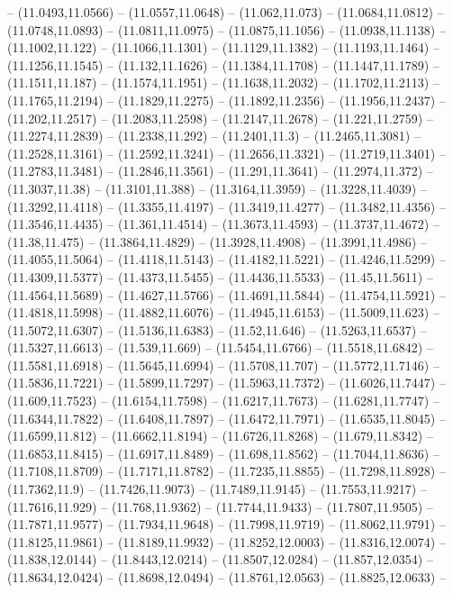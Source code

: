 {-- (11.0493,11.0566) -- (11.0557,11.0648) -- (11.062,11.073) -- (11.0684,11.0812) -- (11.0748,11.0893) -- (11.0811,11.0975) -- (11.0875,11.1056) -- (11.0938,11.1138) -- (11.1002,11.122) -- (11.1066,11.1301) -- (11.1129,11.1382) -- (11.1193,11.1464)
-- (11.1256,11.1545) -- (11.132,11.1626) -- (11.1384,11.1708) -- (11.1447,11.1789) -- (11.1511,11.187) -- (11.1574,11.1951) -- (11.1638,11.2032) -- (11.1702,11.2113) -- (11.1765,11.2194) -- (11.1829,11.2275) -- (11.1892,11.2356) -- (11.1956,11.2437)
-- (11.202,11.2517) -- (11.2083,11.2598) -- (11.2147,11.2678) -- (11.221,11.2759) -- (11.2274,11.2839) -- (11.2338,11.292) -- (11.2401,11.3) -- (11.2465,11.3081) -- (11.2528,11.3161) -- (11.2592,11.3241) -- (11.2656,11.3321) -- (11.2719,11.3401) --
(11.2783,11.3481) -- (11.2846,11.3561) -- (11.291,11.3641) -- (11.2974,11.372) -- (11.3037,11.38) -- (11.3101,11.388) -- (11.3164,11.3959) -- (11.3228,11.4039) -- (11.3292,11.4118) -- (11.3355,11.4197) -- (11.3419,11.4277) -- (11.3482,11.4356) --
(11.3546,11.4435) -- (11.361,11.4514) -- (11.3673,11.4593) -- (11.3737,11.4672) -- (11.38,11.475) -- (11.3864,11.4829) -- (11.3928,11.4908) -- (11.3991,11.4986) -- (11.4055,11.5064) -- (11.4118,11.5143) -- (11.4182,11.5221) -- (11.4246,11.5299) --
(11.4309,11.5377) -- (11.4373,11.5455) -- (11.4436,11.5533) -- (11.45,11.5611) -- (11.4564,11.5689) -- (11.4627,11.5766) -- (11.4691,11.5844) -- (11.4754,11.5921) -- (11.4818,11.5998) -- (11.4882,11.6076) -- (11.4945,11.6153) -- (11.5009,11.623) --
(11.5072,11.6307) -- (11.5136,11.6383) -- (11.52,11.646) -- (11.5263,11.6537) -- (11.5327,11.6613) -- (11.539,11.669) -- (11.5454,11.6766) -- (11.5518,11.6842) -- (11.5581,11.6918) -- (11.5645,11.6994) -- (11.5708,11.707) -- (11.5772,11.7146) --
(11.5836,11.7221) -- (11.5899,11.7297) -- (11.5963,11.7372) -- (11.6026,11.7447) -- (11.609,11.7523) -- (11.6154,11.7598) -- (11.6217,11.7673) -- (11.6281,11.7747) -- (11.6344,11.7822) -- (11.6408,11.7897) -- (11.6472,11.7971) -- (11.6535,11.8045)
-- (11.6599,11.812) -- (11.6662,11.8194) -- (11.6726,11.8268) -- (11.679,11.8342) -- (11.6853,11.8415) -- (11.6917,11.8489) -- (11.698,11.8562) -- (11.7044,11.8636) -- (11.7108,11.8709) -- (11.7171,11.8782) -- (11.7235,11.8855) -- (11.7298,11.8928)
-- (11.7362,11.9) -- (11.7426,11.9073) -- (11.7489,11.9145) -- (11.7553,11.9217) -- (11.7616,11.929) -- (11.768,11.9362) -- (11.7744,11.9433) -- (11.7807,11.9505) -- (11.7871,11.9577) -- (11.7934,11.9648) -- (11.7998,11.9719) -- (11.8062,11.9791) --
(11.8125,11.9861) -- (11.8189,11.9932) -- (11.8252,12.0003) -- (11.8316,12.0074) -- (11.838,12.0144) -- (11.8443,12.0214) -- (11.8507,12.0284) -- (11.857,12.0354) -- (11.8634,12.0424) -- (11.8698,12.0494) -- (11.8761,12.0563) -- (11.8825,12.0633) --
}
